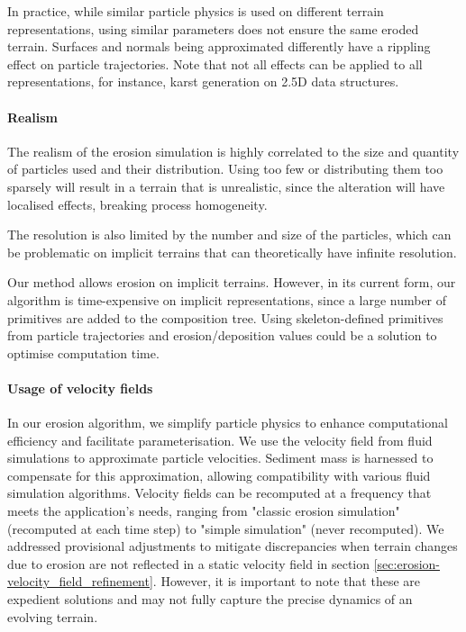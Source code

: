 In practice, while similar particle physics is used on different terrain representations, using similar parameters does not ensure the same eroded terrain. Surfaces and normals being approximated differently have a rippling effect on particle trajectories.  
Note that not all effects can be applied to all representations, for instance, karst generation on 2.5D data structures.

\paragraph{Realism}
The realism of the erosion simulation is highly correlated to the size and quantity of particles used and their distribution. Using too few or distributing them too sparsely will result in a terrain that is unrealistic, since the alteration will have localised effects, breaking process homogeneity.

The resolution is also limited by the number and size of the particles, which can be problematic on implicit terrains that can theoretically have infinite resolution.

Our method allows erosion on implicit terrains. However, in its current form, our algorithm is time-expensive on implicit representations, since a large number of primitives are added to the composition tree. Using skeleton-defined primitives \cite{Hong2013, Rigaudiere2000} from particle trajectories and erosion/deposition values could be a solution to optimise computation time.

\paragraph{Usage of velocity fields}
In our erosion algorithm, we simplify particle physics to enhance computational efficiency and facilitate parameterisation. We use the velocity field from fluid simulations to approximate particle velocities. Sediment mass is harnessed to compensate for this approximation, allowing compatibility with various fluid simulation algorithms. Velocity fields can be recomputed at a frequency that meets the application's needs, ranging from "classic erosion simulation" (recomputed at each time step) to "simple simulation" (never recomputed). We addressed provisional adjustments to mitigate discrepancies when terrain changes due to erosion are not reflected in a static velocity field in section \cref{sec:erosion-velocity_field_refinement}. However, it is important to note that these are expedient solutions and may not fully capture the precise dynamics of an evolving terrain.

